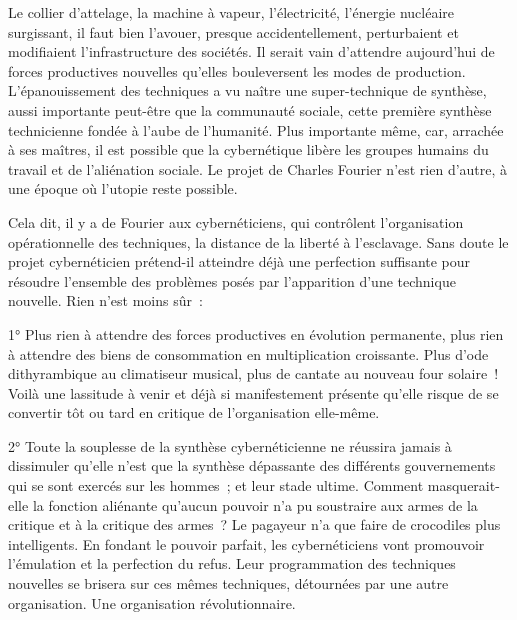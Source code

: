 \documentclass[french,twoside]{book} %
\begin{document}
Le collier d’attelage, la machine à vapeur, l’électricité, l’énergie nucléaire surgissant, il faut bien l’avouer, presque accidentellement, perturbaient et modifiaient l’infrastructure des sociétés. Il serait vain d’attendre aujourd’hui de forces productives nouvelles qu’elles bouleversent les modes de production. L’épanouissement des techniques a vu naître une super-technique de synthèse, aussi importante peut-être que la communauté sociale, cette première synthèse technicienne fondée à l’aube de l’humanité. Plus importante même, car, arrachée à ses maîtres, il est possible que la cybernétique libère les groupes humains du travail et de l’aliénation sociale. Le projet de Charles Fourier n’est rien d’autre, à une époque où l’utopie reste possible.\par
Cela dit, il y a de Fourier aux cybernéticiens, qui contrôlent l’organisation opérationnelle des techniques, la distance de la liberté à l’esclavage. Sans doute le projet cybernéticien prétend-il atteindre déjà une perfection suffisante pour résoudre l’ensemble des problèmes posés par l’apparition d’une technique nouvelle. Rien n’est moins sûr :\par
1° Plus rien à attendre des forces productives en évolution permanente, plus rien à attendre des biens de consommation en multiplication croissante. Plus d’ode dithyrambique au climatiseur musical, plus de cantate au nouveau four solaire ! Voilà une lassitude à venir et déjà si manifestement présente qu’elle risque de se convertir tôt ou tard en critique de l’organisation elle-même.\par
2° Toute la souplesse de la synthèse cybernéticienne ne réussira jamais à dissimuler qu’elle n’est que la synthèse dépassante des différents gouvernements qui se sont exercés sur les hommes ; et leur stade ultime. Comment masquerait-elle la fonction aliénante qu’aucun pouvoir n’a pu soustraire aux armes de la critique et à la critique des armes ? Le pagayeur n’a que faire de crocodiles plus intelligents. En fondant le pouvoir parfait, les cybernéticiens vont promouvoir l’émulation et la perfection du refus. Leur programmation des techniques nouvelles se brisera sur ces mêmes techniques, détournées par une autre organisation. Une organisation révolutionnaire.
\end{document}
